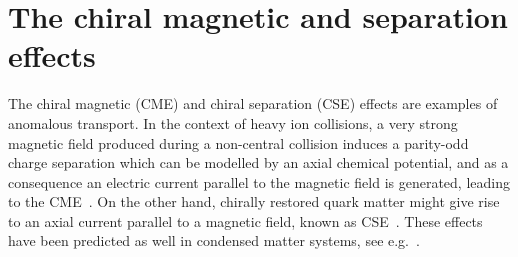 \documentclass[epj]{webofc}
\begin{document}
\section{The chiral magnetic and separation effects}
\label{sec:CME}

The chiral magnetic (CME) and chiral separation (CSE) effects are examples of anomalous transport. In the context of heavy ion collisions, a very strong magnetic field produced during a non-central collision induces a parity-odd charge separation which can be modelled by an axial chemical potential, and as a consequence an electric current parallel to the magnetic field is generated, leading to the CME~\cite{Fukushima:2008xe,Kharzeev:2009pj,KerenZur:2010zw}. On the other hand, chirally restored quark matter might give rise to an axial current parallel to a magnetic field, known as CSE~\cite{Newman:2005as}. These effects have been predicted as well in condensed matter systems, see e.g.~\cite{Basar:2013iaa,Landsteiner:2013sja}.
\end{document}
